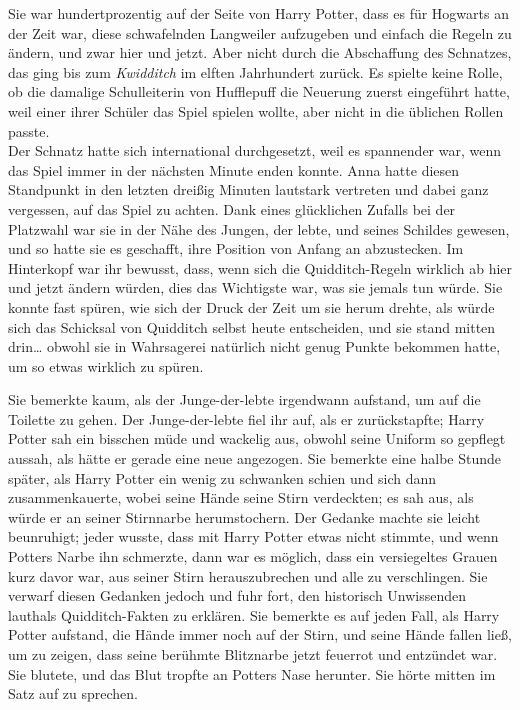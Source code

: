 {Sie war hundertprozentig auf der Seite von Harry Potter, dass es für Hogwarts an der Zeit war, diese schwafelnden Langweiler aufzugeben und einfach die Regeln zu ändern, und zwar hier und jetzt. Aber nicht durch die Abschaffung des Schnatzes, das ging bis zum \emph{Kwidditch} im elften Jahrhundert zurück. Es spielte keine Rolle, ob die damalige Schulleiterin von Hufflepuff die Neuerung zuerst eingeführt hatte, weil einer ihrer Schüler das Spiel spielen wollte, aber nicht in die üblichen Rollen passte.\\ Der Schnatz hatte sich international durchgesetzt, weil es spannender war, wenn das Spiel immer in der nächsten Minute enden konnte. Anna hatte diesen Standpunkt in den letzten dreißig Minuten lautstark vertreten und dabei ganz vergessen, auf das Spiel zu achten. Dank eines glücklichen Zufalls bei der Platzwahl war sie in der Nähe des Jungen, der lebte, und seines Schildes gewesen, und so hatte sie es geschafft, ihre Position von Anfang an abzustecken. Im Hinterkopf war ihr bewusst, dass, wenn sich die Quidditch-Regeln wirklich ab hier und jetzt ändern würden, dies das Wichtigste war, was sie jemals tun würde. Sie konnte fast spüren, wie sich der Druck der Zeit um sie herum drehte, als würde sich das Schicksal von Quidditch selbst heute entscheiden, und sie stand mitten drin… obwohl sie in Wahrsagerei natürlich nicht genug Punkte bekommen hatte, um so etwas wirklich zu spüren.

Sie bemerkte kaum, als der Junge-der-lebte irgendwann aufstand, um auf die Toilette zu gehen. Der Junge-der-lebte fiel ihr auf, als er zurückstapfte; Harry Potter sah ein bisschen müde und wackelig aus, obwohl seine Uniform so gepflegt aussah, als hätte er gerade eine neue angezogen. Sie bemerkte eine halbe Stunde später, als Harry Potter ein wenig zu schwanken schien und sich dann zusammenkauerte, wobei seine Hände seine Stirn verdeckten; es sah aus, als würde er an seiner Stirnnarbe herumstochern. Der Gedanke machte sie leicht beunruhigt; jeder wusste, dass mit Harry Potter etwas nicht stimmte, und wenn Potters Narbe ihn schmerzte, dann war es möglich, dass ein versiegeltes Grauen kurz davor war, aus seiner Stirn herauszubrechen und alle zu verschlingen. Sie verwarf diesen Gedanken jedoch und fuhr fort, den historisch Unwissenden lauthals Quidditch-Fakten zu erklären. Sie bemerkte es auf jeden Fall, als Harry Potter aufstand, die Hände immer noch auf der Stirn, und seine Hände fallen ließ, um zu zeigen, dass seine berühmte Blitznarbe jetzt feuerrot und entzündet war. Sie blutete, und das Blut tropfte an Potters Nase herunter. Sie hörte mitten im Satz auf zu sprechen.

}
